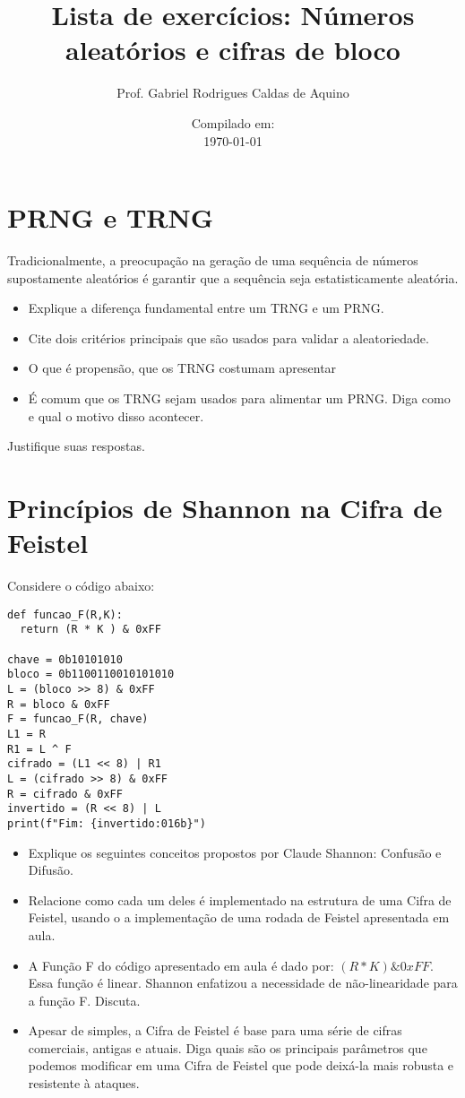 \title{Lista de exercícios: Números aleatórios e cifras de bloco}
\author{Prof. Gabriel Rodrigues Caldas de Aquino}
\date{Compilado em: \\ \today}



\maketitle

\section{PRNG e TRNG}
Tradicionalmente, a preocupação na geração de uma sequência de números supostamente aleatórios é garantir que a sequência seja estatisticamente aleatória. 
\begin{itemize}
    \item Explique a diferença fundamental entre um TRNG e um PRNG.
    \item Cite dois critérios principais que são usados para validar a aleatoriedade.
    \item O que é propensão, que os TRNG costumam apresentar
    \item É comum que os TRNG sejam usados para alimentar um PRNG. Diga como e qual o motivo disso acontecer.
\end{itemize}
Justifique suas respostas.


\section{Princípios de Shannon na Cifra de Feistel} 

Considere o código abaixo:
\begin{verbatim}
def funcao_F(R,K):
  return (R * K ) & 0xFF

chave = 0b10101010                   
bloco = 0b1100110010101010   
L = (bloco >> 8) & 0xFF
R = bloco & 0xFF 
F = funcao_F(R, chave)
L1 = R
R1 = L ^ F
cifrado = (L1 << 8) | R1 
L = (cifrado >> 8) & 0xFF
R = cifrado & 0xFF
invertido = (R << 8) | L
print(f"Fim: {invertido:016b}")      
\end{verbatim}

\begin{itemize}
    \item Explique os seguintes conceitos propostos por Claude Shannon: Confusão e Difusão. 
    \item Relacione como cada um deles é implementado na estrutura de uma Cifra de Feistel, usando o a implementação de uma rodada de Feistel apresentada em aula.
    \item A Função F do código apresentado em aula é dado por: $(R * K) \& 0xFF$. Essa função é linear. Shannon enfatizou a necessidade de não-linearidade para a função F. Discuta.
    \item Apesar de simples, a Cifra de Feistel é base para uma série de cifras comerciais, antigas e atuais. Diga quais são os principais parâmetros que podemos modificar em uma Cifra de Feistel que pode deixá-la mais robusta e resistente à ataques.
\end{itemize}

